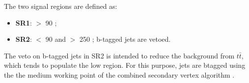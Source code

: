 
The two signal regions are defined as:
\begin{itemize}
\item {\bf SR1}: \mttwo $>$ 90 \GeV;
\item {\bf SR2}: \mttwo $<$ 90 \GeV and \SumMT $>$ 250 \GeV; b-tagged jets are vetoed.
\end{itemize}
The veto on b-tagged jets in SR2 is intended to reduce
the background from $t\bar{t}$, which
tends to populate the low \mttwo region.  For this purpose, jets are btagged
using the the medium working point of the combined secondary vertex algorithm \cite{Chatrchyan:2012jua}. 



